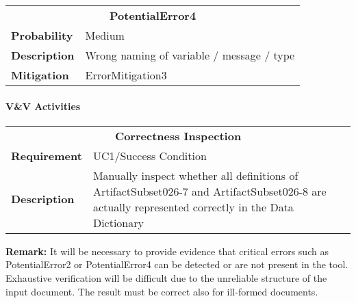 \begin{tabular}{|lp{}|}
\hline
\multicolumn{2}{|c|}{\bf PotentialError4}\\
\bf Probability&Medium\\
\bf Description&Wrong naming of variable / message / type\\
\bf Mitigation&ErrorMitigation3\\
\hline
\end{tabular}

\paragraph{V\&V Activities}

\begin{tabular}{|lp{}|}
\hline
\multicolumn{2}{|c|}{\bf Correctness Inspection}\\
\bf Requirement&UC1/Success Condition\\
\bf Description&Manually inspect whether all definitions of ArtifactSubset026-7 and ArtifactSubset026-8 are actually represented correctly in the Data Dictionary\\
\hline
\end{tabular}



\textbf{Remark: } It will be necessary to provide evidence that critical errors such as PotentialError2 or PotentialError4 can be detected or are not present in the tool. 
                   Exhaustive verification will be difficult due to the unreliable structure of the input document. The result must be correct
                   also for ill-formed documents.

%
